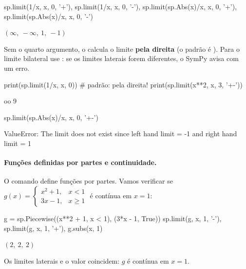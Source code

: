 \begin{entrada}
sp.limit(1/x, x, 0, '+'), sp.limit(1/x, x, 0, '-'), sp.limit(sp.Abs(x)/x, x, 0, '+'), sp.limit(sp.Abs(x)/x, x, 0, '-')
\end{entrada}
\begin{saidamat}
$\displaystyle \left( \infty, \  -\infty, \  1, \  -1\right)$
\end{saidamat}

\begin{atencao}
Sem o quarto argumento, o  calcula o limite \textbf{pela direita} (o padrão é ). Para o
limite bilateral use : se os limites laterais forem diferentes, o SymPy avisa com um erro.
\end{atencao}

\begin{entrada}
print(sp.limit(1/x, x, 0))          # padrão: pela direita!
print(sp.limit(x**2, x, 3, '+-'))
\end{entrada}
\begin{saida}
oo
9
\end{saida}

\begin{entrada}
sp.limit(sp.Abs(x)/x, x, 0, '+-')
\end{entrada}
\begin{saida}
ValueError: The limit does not exist since left hand limit = -1 and right hand limit = 1
\end{saida}

\paragraph{Funções definidas por partes e continuidade.} O comando  define funções por partes.
Vamos verificar se
$g(x)=\begin{cases}x^2+1, & x<1\\ 3x-1, & x\ge1\end{cases}$ é contínua em $x=1$:

\begin{entrada}
g = sp.Piecewise((x**2 + 1, x < 1), (3*x - 1, True))
sp.limit(g, x, 1, '-'), sp.limit(g, x, 1, '+'), g.subs(x, 1)
\end{entrada}
\begin{saidamat}
$\displaystyle \left( 2, \  2, \  2\right)$
\end{saidamat}

Os limites laterais e o valor coincidem: $g$ é contínua em $x=1$.

